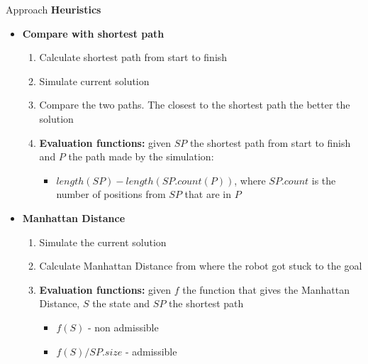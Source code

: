 


\begin{frame}{Approach}
    \textbf{Heuristics}
    \begin{itemize}
        \item \textbf{Compare with shortest path}
        \begin{enumerate}
            \item Calculate shortest path from start to finish
            \item Simulate current solution 
            \item Compare the two paths. The closest to the shortest path the better the solution
            \item \textbf{Evaluation functions:} given $SP$ the shortest path from start to finish and $P$ the path made by the simulation:
            \begin{itemize}
                \item $length(SP) - length(SP.count(P))$, where $SP.count$ is the number of positions from $SP$ that are in $P$
            \end{itemize}
        \end{enumerate}
        \item \textbf{Manhattan Distance}
        \begin{enumerate}
            \item Simulate the current solution
            \item Calculate Manhattan Distance from where the robot got stuck to the goal
            \item \textbf{Evaluation functions:} given $f$ the function that gives the Manhattan Distance, $S$ the state and $SP$ the shortest path
            \begin{itemize}
                \item $f(S)$ - non admissible
                \item $f(S) / SP.size$ - admissible
            \end{itemize}
        \end{enumerate}
    \end{itemize}
    
\end{frame}


